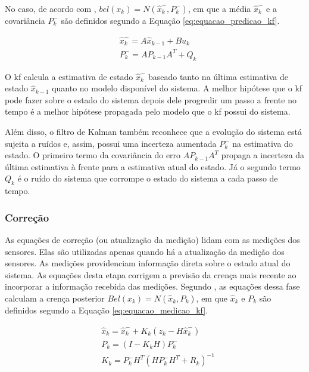 \documentclass[acronym, symbols, table]{fei}
\begin{document}
				No caso, de acordo com \textcite{thrun2002probabilistic}, $bel(x_k) = N(\hat{x}_{k}^{-},P_{k}^{-})$, em que a média $\hat{x}_{k}^{-}$ e a covariância $P_{k}^{-}$ são definidos segundo a Equação \eqref{eq:equacao_predicao_kf}.
				
				\begin{equation} \label{eq:equacao_predicao_kf}
					\begin{split}
						&\hat{x}_{k}^{-} = A\hat{x}_{k-1} + Bu_{k} \\
						&P_{k}^{-} = AP_{k-1}A^{T} + Q_{k}					
					\end{split}
				\end{equation}
			
				O \acrshort{kf} calcula a estimativa de estado  $\hat{x}_{k}^{-}$ baseado tanto na última estimativa de estado $\hat{x}_{k-1}$ quanto no modelo disponível do sistema. A melhor hipótese que o \acrshort{kf} pode fazer sobre o estado do sistema depois dele progredir um passo a frente no tempo é a melhor hipótese propagada pelo modelo que o \acrshort{kf} possui do sistema.
				
				Além disso, o filtro de Kalman também reconhece que a evolução do sistema está sujeita a ruídos e, assim, possui uma incerteza aumentada $P_{k}^{-}$ na estimativa do estado. O primeiro termo da covariância do erro $AP_{k-1}A^{T}$ propaga a incerteza da última estimativa à frente para a estimativa atual do estado. Já o segundo termo $Q_{k}$ é o ruído do sistema que corrompe o estado do sistema a cada passo de tempo.
			
			\subsubsection{Correção}
			
				As equações de correção (ou atualização da medição) lidam com as medições dos sensores. Elas são utilizadas apenas quando há a atualização da medição dos sensores. As medições providenciam informação direta sobre o estado atual do sistema. As equações desta etapa corrigem a previsão da crença mais recente ao incorporar a informação recebida das medições. Segundo \textcite{thrun2002probabilistic}, as equações dessa fase calculam a crença posterior $Bel(x_k) = N(\hat{x}_{k},P_{k})$, em que $\hat{x}_{k}$ e $P_{k}$ são definidos segundo a Equação \eqref{eq:equacao_medicao_kf}.
				
				\begin{equation} \label{eq:equacao_medicao_kf}
					\begin{split}
						&\hat{x}_{k} = \hat{x}_{k}^{-} + K_{k}(z_k - H\hat{x}_{k}^{-}) \\
						&P_{k} = (I - K_kH)P_{k}^{-} \\
						&K_k =  P_{k}^{-}H^T(HP_{k}^{-}H^T + R_k)^{-1}
					\end{split}
				\end{equation}
			
\end{document}
